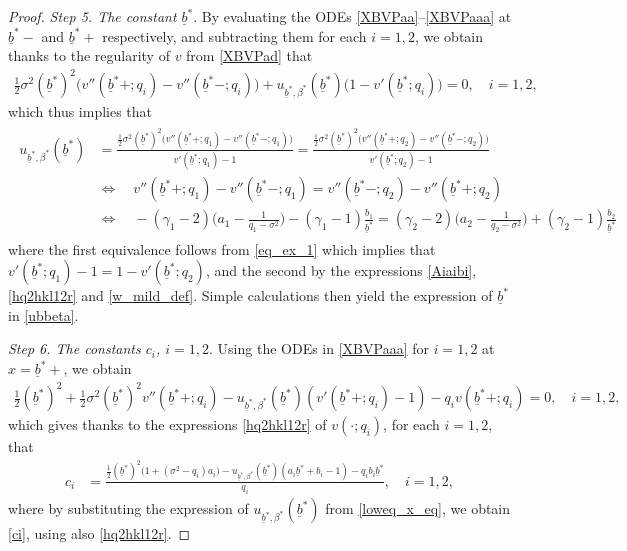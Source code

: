 \documentclass[11pt]{article} %
\def\ub{\underline{b}}
\numberwithin{komcounter}{section}
\begin{document}
\begin{proof}
\vspace{1mm}
{\it Step 5. The constant $\ub^*$}.
By evaluating the ODEs \eqref{XBVPaa}--\eqref{XBVPaaa} at $\ub^*-$ and $\ub^*+$ respectively, and subtracting them for each $i=1,2$, we obtain thanks to the regularity of $v$ from \eqref{XBVPad} that
\begin{align} \label{eq:premub}
\tfrac12 \sigma^2 (\ub^*)^2 \big(v''(\ub^*+;q_i) - v''(\ub^*-;q_i) \big) + u_{\ub^*,\beta^*}(\ub^*) \big(1 - v'(\ub^*;q_i)\big) = 0 
, \quad i=1,2,
\end{align}
which thus implies that 
\begin{align}
\begin{split}
u_{\ub^*,\beta^*}(\ub^*) 
&= \frac{\tfrac12 \sigma^2 (\ub^*)^2 \big(v''(\ub^*+;q_1) - v''(\ub^*-;q_1) \big)}{v'(\ub^*;q_1) - 1} 
= \frac{\tfrac12 \sigma^2 (\ub^*)^2 \big(v''(\ub^*+;q_2) - v''(\ub^*-;q_2) \big)}{v'(\ub^*;q_2) - 1} \\
&\Leftrightarrow \quad 
v''(\ub^*+;q_1) - v''(\ub^*-;q_1) = v''(\ub^*-;q_2) - v''(\ub^*+;q_2) \\
&\Leftrightarrow \quad 
-(\gamma_1 - 2) \Big(a_1 -\frac{1}{q_1-\sigma^2}\Big) - (\gamma_1 - 1) \frac{b_1}{\ub^*} = (\gamma_2 - 2) \Big(a_2 -\frac{1}{q_2-\sigma^2}\Big) + (\gamma_2 - 1) \frac{b_2}{\ub^*} 
\end{split}
\label{loweq_x_eq}
\end{align}
where the first equivalence follows from \eqref{eq_ex_1} which implies that $v'(\ub^*;q_1) - 1 = 1 - v'(\ub^*;q_2)$, and the second by the expressions \eqref{Aiaibi}, \eqref{hq2hkl12r} and \eqref{w_mild_def}. Simple calculations then yield the expression of $\ub^*$ in \eqref{ubbeta}.

\vspace{1mm}
{\it Step 6. The constants $c_i$, $i=1,2$}. 
Using the ODEs in \eqref{XBVPaaa} for $i=1,2$ at $x=\ub^*+$, we obtain 
\begin{align*}
\tfrac12 (\ub^*)^2 + \tfrac12 \sigma^2 (\ub^*)^2 v''(\ub^*+;q_i) - u_{\ub^*,\beta^*}(\ub^*) (v'(\ub^*+;q_i) - 1) - q_i v(\ub^*+;q_i) = 0, \quad i=1,2,  
\end{align*}
which gives thanks to the expressions \eqref{hq2hkl12r} of $v(\cdot;q_i)$, for each $i=1,2$, that 
\begin{align*}
c_i 
&= \frac{\tfrac12 (\ub^*)^2 \big(1 + (\sigma^2 - q_i) a_i \big) - u_{\ub^*,\beta^*}(\ub^*) (a_i \ub^* + b_i - 1) - q_i b_i \ub^*}{q_i} 
, \quad i=1,2,
\end{align*}
where by substituting the expression of $u_{\ub^*,\beta^*}(\ub^*)$ from \eqref{loweq_x_eq}, we obtain \eqref{ci}, using also \eqref{hq2hkl12r}. 


\end{proof}
\end{document}
